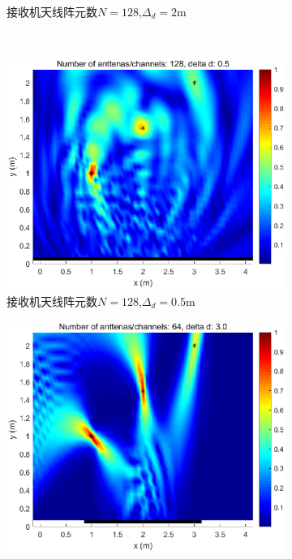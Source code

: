 \begin{figure}[H]
\begin{subfigure}[t]{.45\linewidth}
      \caption{接收机天线阵元数$N=128$,$\Delta_d = 2\text{m}$}
  \end{subfigure}
  \\
  \begin{subfigure}[t]{.45\linewidth}
    \centering
    \includegraphics[width=1\textwidth]{figures/cm/N128d0.5.eps}
    \caption{接收机天线阵元数$N=128$,$\Delta_d = 0.5\text{m}$}
  \end{subfigure}
  \begin{subfigure}[t]{.45\linewidth}
    \centering
    \includegraphics[width=1\textwidth]{figures/cm/N64d3.eps}

\end{subfigure}
\end{figure}
